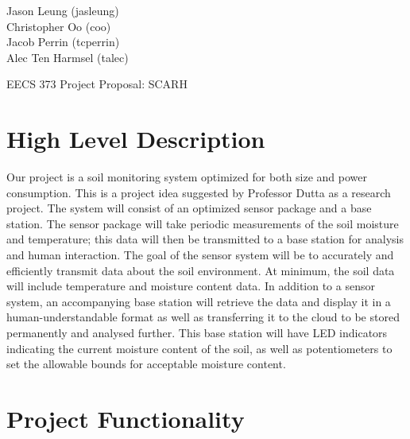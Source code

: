 \documentclass{article}
\begin{document}
\begin{flushright}
    Jason Leung (jasleung)\\
    Christopher Oo (coo)\\
    Jacob Perrin (tcperrin)\\
    Alec Ten Harmsel (talec)
\end{flushright}

\begin{center}
    {\Huge
        EECS 373 Project Proposal: SCARH
    }
\end{center}

\section{High Level Description}
Our project is a soil monitoring system optimized for both size and power
consumption.  This is a project idea suggested by Professor Dutta as a research
project. The system will consist of an optimized sensor package and a base
station. The sensor package will take periodic measurements of the soil
moisture and temperature; this data will then be transmitted to a base station
for analysis and human interaction. The goal of the sensor system will be to
accurately and efficiently transmit data about the soil environment. At
minimum, the soil data will include temperature and moisture content data. In
addition to a sensor system, an accompanying base station will retrieve the
data and display it in a human-understandable format as well as transferring it
to the cloud to be stored permanently and analysed further. This base station
will have LED indicators indicating the current moisture content of the soil,
as well as potentiometers to set the allowable bounds for acceptable moisture
content.

\section{Project Functionality}
\end{document}
